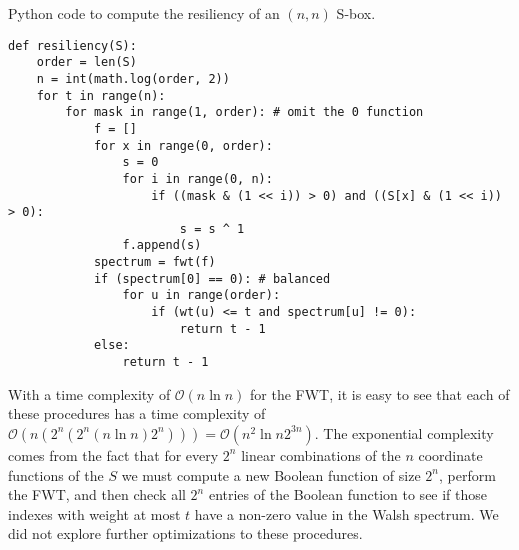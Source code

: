 \begin{listing}[ht!]
\caption{Python code to compute the resiliency of an $(n, n)$ S-box.}
\begin{verbatim}
def resiliency(S):
	order = len(S)
	n = int(math.log(order, 2))
	for t in range(n):
		for mask in range(1, order): # omit the 0 function
			f = []
			for x in range(0, order):
				s = 0
				for i in range(0, n):
					if ((mask & (1 << i)) > 0) and ((S[x] & (1 << i)) > 0):
						s = s ^ 1
				f.append(s)
			spectrum = fwt(f)
			if (spectrum[0] == 0): # balanced
				for u in range(order):
					if (wt(u) <= t and spectrum[u] != 0):
						return t - 1
			else:
				return t - 1
\end{verbatim}
\label{lst:resiliencyCode}
\end{listing}

With a time complexity of $\mathcal{O}(n \ln n)$ for the FWT, it is easy to see that each of these procedures has a time complexity of $\mathcal{O}(n(2^{n}(2^n(n\ln n)2^n))) = \mathcal{O}(n^2\ln n 2^{3n})$. The exponential complexity comes from the fact that for every $2^n$ linear combinations of the $n$ coordinate functions of the $S$ we must compute a new Boolean function of size $2^n$, perform the FWT, and then check all $2^n$ entries of the Boolean function to see if those indexes with weight at most $t$ have a non-zero value in the Walsh spectrum. We did not explore further optimizations to these procedures. 

